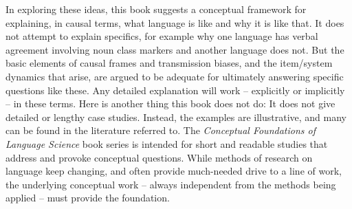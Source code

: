 In exploring these ideas, this book suggests a conceptual framework for explaining, in causal terms, what language is like and why it is like that. It does not attempt to explain specifics, for example why one language has verbal agreement involving noun class markers and another language does not. But the basic elements of causal frames and transmission biases, and the item/system dynamics that arise, are argued to be adequate for ultimately answering specific questions like these. Any detailed explanation will work -- explicitly or implicitly -- in these terms. Here is another thing this book does not do: It does not give detailed or lengthy case studies. Instead, the examples are illustrative, and many can be found in the literature referred to. The \textit{Conceptual Foundations of Language Science} book series is intended for short and readable studies that address and provoke conceptual questions. While methods of research on language keep changing, and often provide much-needed drive to a line of work, the underlying conceptual work -- always independent from the methods being applied -- must provide the foundation.
